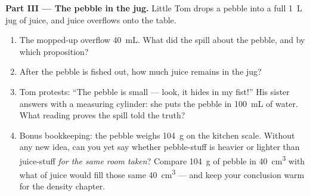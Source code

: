 \begin{problem}
\medskip\noindent\textbf{Part III --- The pebble in the jug.}
Little Tom drops a pebble into a full \qty{1}{L} jug of juice, and
juice overflows onto the table.
\begin{enumerate}[resume]
  \item The mopped-up overflow  \qty{40}{mL}. What did the
        spill  about the pebble, and by which proposition?
  \item After the pebble is fished out, how much juice remains in
        the jug?
  \item Tom protests: ``The pebble is small --- look, it hides in
        my fist!'' His sister answers with a measuring cylinder:
        she puts the pebble in \qty{100}{mL} of water. What
        reading proves the spill told the truth?
  \item Bonus bookkeeping: the pebble weighs \qty{104}{g} on the
        kitchen scale. Without any new idea, can you yet say
        whether pebble-stuff is heavier or lighter than
        juice-stuff \emph{for the same room taken}? Compare
        \qty{104}{g} of pebble in \qty{40}{cm^3} with what  of
        juice would fill those same \qty{40}{cm^3} --- and keep
        your conclusion warm for the density chapter.
\end{enumerate}
\end{problem}
